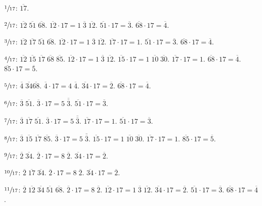 \documentclass{article}
\begin{document}
$\sfrac{1}{17}$: $\overline{17}$.

$\sfrac{2}{17}$: $\overline{12} \; \overline{51} \; \overline{68}$.
$\overline{12} \cdot 17 = 1 \; \overline{3} \; \overline{12}$.
$\overline{51} \cdot 17 = \overline{3}$.
$\overline{68} \cdot 17 = \overline{4}$.

$\sfrac{3}{17}$: $\overline{12} \; \overline{17} \; \overline{51} \; \overline{68}$. 
$\overline{12} \cdot 17 = 1 \; \overline{3} \; \overline{12}$.
$\overline{17} \cdot 17 = 1$.
$\overline{51} \cdot 17 = \overline{3}$.
$\overline{68} \cdot 17 = \overline{4}$.

$\sfrac{4}{17}$: $\overline{12} \; \overline{15} \; \overline{17} \; \overline{68} \; \overline{85}$.
$\overline{12} \cdot 17 = 1 \; \overline{3} \; \overline{12}$.
$\overline{15} \cdot 17 = 1 \; \overline{10} \; \overline{30}$.
$\overline{17} \cdot 17 = 1$.
$\overline{68} \cdot 17 = \overline{4}$.
$\overline{85} \cdot 17 = \overline{5}$.

$\sfrac{5}{17}$: $\overline{4} \; \overline{34} \overline{68}$.
$\overline{4} \cdot 17 = 4 \; \overline{4}$.
$\overline{34} \cdot 17 = \overline{2}$.
$\overline{68} \cdot 17 = \overline{4}$.

$\sfrac{6}{17}$: $\overline{3} \; \overline{51}$.
$\overline{3} \cdot 17 = 5 \; \overline{\overline{3}}$.
$\overline{51} \cdot 17 = \overline{3}$.

$\sfrac{7}{17}$: $\overline{3} \; \overline{17} \; \overline{51}$.
$\overline{3} \cdot 17 = 5 \; \overline{\overline{3}}$.
$\overline{17} \cdot 17 =1$.
$\overline{51} \cdot 17 = \overline{3}$.

$\sfrac{8}{17}$: $\overline{3} \; \overline{15} \; \overline{17} \; \overline{85}$.
$\overline{3} \cdot 17 = 5 \; \overline{\overline{3}}$.
$\overline{15} \cdot 17 = 1 \; \overline{10} \; \overline{30}$.
$\overline{17} \cdot 17 = 1$.
$\overline{85} \cdot 17 = \overline{5}$.

$\sfrac{9}{17}$: $\overline{2} \; \overline{34}$.
$\overline{2} \cdot 17 = 8 \; \overline{2}$.
$\overline{34} \cdot 17 = \overline{2}$.

$\sfrac{10}{17}$: $\overline{2} \; \overline{17} \; \overline{34}$.
$\overline{2} \cdot 17 = 8 \; \overline{2}$.
$\overline{34} \cdot 17 = \overline{2}$.

$\sfrac{11}{17}$: $\overline{2} \; \overline{12} \; \overline{34} \; \overline{51} \; \overline{68}$.
$\overline{2} \cdot 17 = 8 \; \overline{2}$.
$\overline{12} \cdot 17 = 1 \; \overline{3} \; \overline{12}$.
$\overline{34} \cdot 17 = \overline{2}$.
$\overline{51} \cdot 17 = \overline{3}$.
$\overline{68} \cdot 17 = \overline{4}$.
\end{document}

